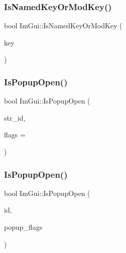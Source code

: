 \subsubsection{\texorpdfstring{Is\+Named\+Key\+Or\+Mod\+Key()}{IsNamedKeyOrModKey()}}
{\footnotesize\ttfamily bool Im\+Gui\+::\+Is\+Named\+Key\+Or\+Mod\+Key (\begin{DoxyParamCaption}\item[{\hyperlink{imgui_8h_aa22ffe36b188427d712447ec465203d4}{Im\+Gui\+Key}}]{key }\end{DoxyParamCaption})\hspace{0.3cm}{\ttfamily [inline]}}

\mbox{\label{namespaceImGui_a0e351145d0936e79948094166757712e}} 
\subsubsection{\texorpdfstring{Is\+Popup\+Open()}{IsPopupOpen()}\hspace{0.1cm}{\footnotesize\ttfamily [1/2]}}
{\footnotesize\ttfamily bool Im\+Gui\+::\+Is\+Popup\+Open (\begin{DoxyParamCaption}\item[{const char $\ast$}]{str\+\_\+id,  }\item[{Im\+Gui\+Popup\+Flags}]{flags = {} }\end{DoxyParamCaption})}

\mbox{\label{namespaceImGui_ad6bbd52db52d44eb7e96b882d7ae2c17}} 
\subsubsection{\texorpdfstring{Is\+Popup\+Open()}{IsPopupOpen()}\hspace{0.1cm}{\footnotesize\ttfamily [2/2]}}
{\footnotesize\ttfamily bool Im\+Gui\+::\+Is\+Popup\+Open (\begin{DoxyParamCaption}\item[{Im\+Gui\+ID}]{id,  }\item[{Im\+Gui\+Popup\+Flags}]{popup\+\_\+flags }\end{DoxyParamCaption})}

\mbox{\label{namespaceImGui_a578ead6237b3ed05497ed361f18d9f97}} 
